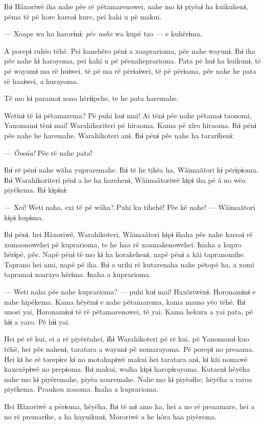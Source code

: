 Ɨhɨ Hãxoriwë iha nahe pẽe rë pëtamarenowei, nahe mo kɨ piyëaɨ ha
kuikuhenɨ, pëma të pë hore kareaɨ kure, pei kahi u pë makui. 

--- Xoape wa ha harorɨnɨ: \textit{pẽe nahe} wa kupë tao --- e kuhërɨma. 

A porepɨ rukëo tëhë. Pei kanehẽro pënɨ a xoaprarioma, pẽe nahe wayunɨ.
Ɨhɨ iha pẽe nahe kɨ harayoma, pei kahi u pë pẽenaheprarioma. Pata pë huɨ
ha kuikunɨ, të pë wayumɨ ma rë huɨwei, të pë ma rë përɨaɨwei, të pë
përɨama, pẽe nahe he pata rë haaɨwei, a hurayoma. 

Të mo kɨ paramaɨ xoao hërɨɨpehe, te he pata haremahe. 

Wetinɨ të kɨ pëtamarema? Pë puhi kuɨ mai! Ai tënɨ pẽe nahe pëtamaɨ
taonomi, Yanomamɨ tënɨ mai! Warahikoriteri pë hiraoma. Kama pë xĩro
hiraoma. Ɨhɨ pënɨ pẽe nahe he haremahe. Warahikoteri anɨ. Ɨhɨ pënɨ pẽe
nahe ha tararɨhenɨ: 

--- \textit{Õooãa!} Pẽe rë nahe pata! 

Ɨhɨ rë pënɨ nahe wãha yupraremahe. Ɨhɨ të he tikëa ha, Wãimaãtori kɨ
përɨpɨoma. Ɨhɨ Warahikoriteri pënɨ a he ha harehenɨ, Wãimaãtoriwë kɨpɨ
iha pë ã no wëa piyëkema. Ɨhɨ kɨpɨnɨ:

--- Xei! Weti naha, exi të pë wãha? Puhi ku tihehë! Pẽe kë nahe! ---
Wãimaãtori kɨpɨ kupɨma.

Ɨhɨ pënɨ, hei Hãxoriwë, Warahikoteri, Wãimaãtori kɨpɨ ɨ̃naha pẽe nahe
kareaɨ rë xomaonowehei pë kuprarioma, te he haa rë xoamakenowehei. Ɨnaha
a kupro hërɨpë, pẽe. Napë pënɨ të mo kɨ ha horakehenɨ, napë pënɨ a kãi
tapranomihe. Taprano hei ami, napë pë iha. Ɨhɨ a urihi rë kutarenaha
nahe pëtopë ha, a xomi tapramaɨ xoarayo hërɨma. Ɨnaha a kuprarioma. 

--- Weti naha pẽe nahe kuprarioma? --- puhi kuɨ mai! Haxõriwënɨ. Horonamɨnɨ
e nahe hipëkema. Kama hëyëmɨ e nahe pëtamarema, kama mamo yëo tëhë. Ɨhɨ
unosi yai, Horonamɨnɨ të rë pëtamarenowei, të yai. Kama hekura a yai
pata, pë hɨɨ a yaro. Pë hɨɨ yai. 

Hei pë rë kui, ei a rë piyërëahei, ɨ̃hɨ Warahikoteri pë rë kui, pë
Yanomamɨ kuo tëhë, hei pẽe nahenɨ, taratara a wayunɨ pë nomarayoma. Pë
porepɨ no preaama. Hei kɨ he rë torepɨre kɨ no motahapɨwë makui hei
taratara anɨ, kɨ kãi nomawë kaxexëpɨwë no prepɨoma. Ɨhɨ makui, waiha
kɨpɨ haropɨrayoma. Kutaenɨ hëyëha nahe mo kɨ piyëremahe, piyëa
xoaremahe. Nahe mo kɨ piyëaɨhe, hëyëha a raroa piyëkema. Praukou xoaoma.
Ɨnaha a kuprarioma. 

Hei Hãxoriwë a përɨoma, hëyëha. Ɨhɨ të mɨ amo ha, hei a no rë preaamare,
hei a no rë premarɨhe, a ha hayuikunɨ, Mororiwë a he hõra haa piyërema.


